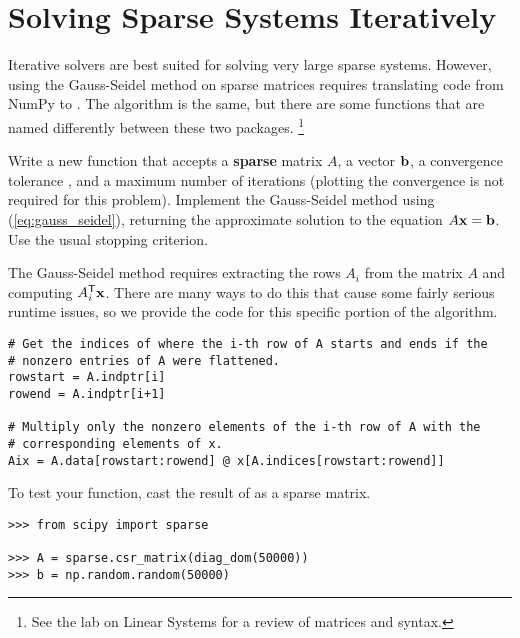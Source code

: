 \begin{comment} %
\begin{problem} %
The Gauss-Seidel method is faster than the standard system solver used by SciPy's \li{la.solve()} if the system is sufficiently large and sufficiently sparse.
For $n=5,6,\ldots,11$, generate a random $2^n \times 2^n$ matrix $A$ using \li{diag_dom()} and a random $2^n$ vector $\b$.
Time how long it takes to solve $A\x = \b$ using your Gauss-Seidel function from Problem \ref{prob:gauss_seidel}, and how long it takes to solve using \li{la.solve()}.
Make a log-log plot of the times against the system size.
\end{problem}
\end{comment}

\section*{Solving Sparse Systems Iteratively} %

Iterative solvers are best suited for solving very large sparse systems.
However, using the Gauss-Seidel method on sparse matrices requires translating code from NumPy to .
The algorithm is the same, but there are some functions that are named differently between these two packages.%
\footnote{See the lab on Linear Systems for a review of  matrices and syntax.}

\begin{problem} %
Write a new function that accepts a \textbf{sparse} matrix $A$, a vector $\mathbf{b}$, a convergence tolerance , and a maximum number of iterations  (plotting the convergence is not required for this problem).
Implement the Gauss-Seidel method using (\ref{eq:gauss_seidel}), returning the approximate solution to the equation $A\mathbf{x} = \mathbf{b}$.
Use the usual stopping criterion.

The Gauss-Seidel method requires extracting the rows $A_i$ from the matrix $A$ and computing $A_i^{\mathsf T}\mathbf{x}$.
There are many ways to do this that cause some fairly serious runtime issues, so we provide the code for this specific portion of the algorithm.

\begin{lstlisting}
# Get the indices of where the i-th row of A starts and ends if the
# nonzero entries of A were flattened.
rowstart = A.indptr[i]
rowend = A.indptr[i+1]

# Multiply only the nonzero elements of the i-th row of A with the
# corresponding elements of x.
Aix = A.data[rowstart:rowend] @ x[A.indices[rowstart:rowend]]
\end{lstlisting}

To test your function, cast the result of  as a sparse matrix.

\begin{lstlisting}
>>> from scipy import sparse

>>> A = sparse.csr_matrix(diag_dom(50000))
>>> b = np.random.random(50000)
\end{lstlisting}
\end{problem}

